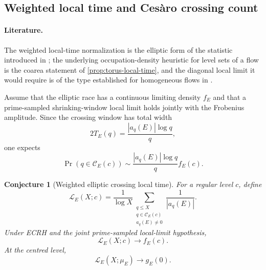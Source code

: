 \documentclass[11pt,reqno]{amsart}
\newtheorem{conjecture}{Conjecture}
\theoremstyle{remark}
\begin{document}
\subsection{Weighted local time and Ces\`aro crossing count}

\paragraph{Literature.}
The weighted local-time normalization is the elliptic form of the statistic introduced in \cite{PlanatFalseCheb2026}; the underlying occupation-density heuristic for level sets of a flow is the coarea statement of \cref{prop:torus-local-time}, and the diagonal local limit it would require is of the type established for homogeneous flows in \cite{HillVelani1995,KleinbockMargulis1999}.

Assume that the elliptic race has a continuous limiting density $f_E$ and that a prime-sampled shrinking-window local limit holds jointly with the Frobenius amplitude.  Since the crossing window has total width
\begin{equation}
  2T_E(q)=\frac{|a_q(E)|\log q}{q},
\end{equation}
one expects
\begin{equation}
  \Pr(q\in\mathcal C_E(c))
  \sim \frac{|a_q(E)|\log q}{q}f_E(c).
  \label{eq:crossing-probability}
\end{equation}

\begin{conjecture}[Weighted elliptic crossing local time]
For a regular level $c$, define
\begin{equation}
  \mathcal L_E(X;c)
  =\frac{1}{\log X}
  \sum_{\substack{q\le X\\q\in\mathcal C_E(c)\\a_q(E)\ne0}}
  \frac{1}{|a_q(E)|}.
  \label{eq:weighted-local-time}
\end{equation}
Under ECRH and the joint prime-sampled local-limit hypothesis,
\begin{equation}
  \boxed{\mathcal L_E(X;c)\longrightarrow f_E(c).}
  \label{eq:local-time-limit}
\end{equation}
At the centred level,
\begin{equation}
  \mathcal L_E(X;\mu_E)\longrightarrow g_E(0).
\end{equation}
\end{conjecture}
\end{document}
